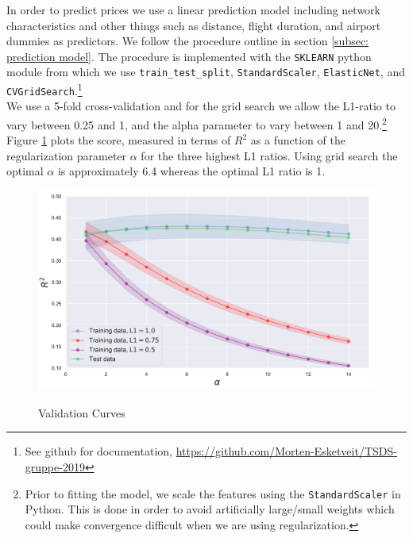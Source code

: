 \noindent
In order to predict prices we use a linear prediction model including network characteristics and other things such as distance, flight duration, and airport dummies as predictors. We follow the procedure outline in section \ref{subsec: prediction model}. The procedure is implemented with the \texttt{SKLEARN} python module from which we use \texttt{train\_test\_split}, \texttt{StandardScaler}, \texttt{ElasticNet}, and  \texttt{CVGridSearch}.\footnote{See github for documentation, \url{https://github.com/Morten-Esketveit/TSDS-gruppe-2019}}
\medskip\\
We use a 5-fold cross-validation and for the grid search we allow the L1-ratio to vary between 0.25 and 1, and the alpha parameter to vary between 1 and 20.\footnote{Prior to fitting the model, we scale the features using the \texttt{StandardScaler} in Python. This is done in order to avoid artificially large/small weights which could make convergence difficult when we are using regularization.} Figure \ref{fig:validation curve} plots the score, measured in terms of $R^2$ as a function of the regularization parameter $\alpha$ for the three highest L1 ratios. Using grid search the optimal $\alpha$ is approximately 6.4 %
whereas the optimal L1 ratio is 1.
\begin{figure}[H]
  \centering
  \caption{Validation Curves}
    \includegraphics[width=1. \textwidth]{Exam/Figures/validation_curve.pdf}
  \label{fig:validation curve}
\end{figure}
\noindent
